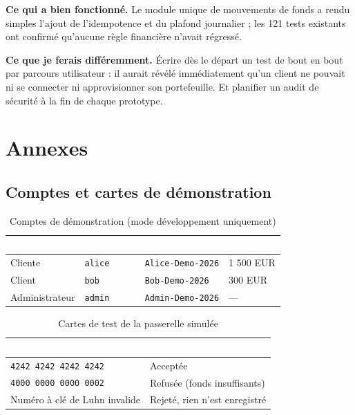 \documentclass[11pt,a4paper]{report}
\newcommand{\entete}{\rowcolor{primaire}}
\newcommand{\tete}[1]{\textcolor{white}{\textbf{#1}}}
\newcommand{\code}[1]{\texttt{\small #1}}
\begin{document}
\begin{encadre}[title=Bilan et rétrospective]
\textbf{Ce qui a bien fonctionné.} Le module unique de mouvements de fonds a rendu
simples l'ajout de l'idempotence et du plafond journalier ; les 121 tests existants ont
confirmé qu'aucune règle financière n'avait régressé.

\smallskip
\textbf{Ce que je ferais différemment.} Écrire dès le départ un test de bout en bout
par parcours utilisateur : il aurait révélé immédiatement qu'un client ne pouvait ni se
connecter ni approvisionner son portefeuille. Et planifier un audit de sécurité à la
fin de chaque prototype.
\end{encadre}

\appendix
\chapter{Annexes}

\section{Comptes et cartes de démonstration}

\begin{table}[H]
\centering
\caption{Comptes de démonstration (mode développement uniquement)}
\begin{tabular}{@{}llll@{}}
\toprule
\entete \tete{Rôle} & \tete{Identifiant} & \tete{Mot de passe} & \tete{Départ} \\
\midrule
Cliente & \code{alice} & \code{Alice-Demo-2026} & 1 500 EUR \\
Client & \code{bob} & \code{Bob-Demo-2026} & 300 EUR \\
Administrateur & \code{admin} & \code{Admin-Demo-2026} & --- \\
\bottomrule
\end{tabular}
\end{table}

\begin{table}[H]
\centering
\caption{Cartes de test de la passerelle simulée}
\begin{tabular}{@{}ll@{}}
\toprule
\entete \tete{Carte} & \tete{Résultat} \\
\midrule
\code{4242 4242 4242 4242} & Acceptée \\
\code{4000 0000 0000 0002} & Refusée (fonds insuffisants) \\
Numéro à clé de Luhn invalide & Rejeté, rien n'est enregistré \\
\bottomrule
\end{tabular}
\end{table}
\end{document}
